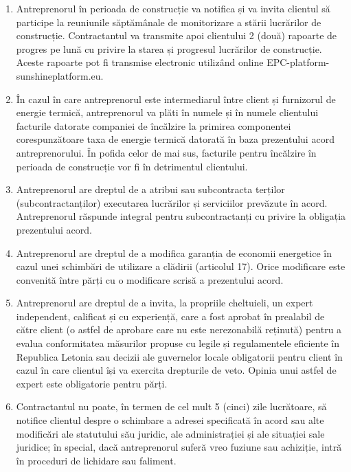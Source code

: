 \begin{multicols}{2}
\begin{enumerate}
\item Antreprenorul în perioada de construcție va notifica și va invita clientul să participe la reuniunile săptămânale de monitorizare a stării lucrărilor de construcție. Contractantul va transmite apoi clientului 2 (două) rapoarte de progres pe lună cu privire la starea și progresul lucrărilor de construcție. Aceste rapoarte pot fi transmise electronic utilizând online EPC-platform- sunshineplatform.eu.
\item În cazul în care antreprenorul este intermediarul între client și furnizorul de energie termică, antreprenorul va plăti în numele și în numele clientului facturile datorate companiei de încălzire la primirea componentei corespunzătoare taxa de energie termică datorată în baza prezentului acord  antreprenorului. În pofida celor de mai sus, facturile pentru încălzire în perioada de construcție vor fi în detrimentul clientului.
\item Antreprenorul are dreptul de a atribui sau subcontracta terților (subcontractanților) executarea lucrărilor și serviciilor prevăzute în acord. Antreprenorul răspunde integral pentru subcontractanți cu privire la obligația prezentului acord.
\item Antreprenorul are dreptul de a modifica garanția de economii energetice în cazul unei schimbări de utilizare a clădirii (articolul 17). Orice modificare este convenită între părți cu o modificare scrisă a prezentului acord.
\item Antreprenorul are dreptul de a invita, la propriile cheltuieli, un expert independent, calificat și cu experiență, care a fost aprobat în prealabil de către client (o astfel de aprobare care nu este nerezonabilă reținută) pentru a evalua conformitatea măsurilor propuse cu legile și regulamentele eficiente în Republica Letonia sau decizii ale guvernelor locale obligatorii pentru client în cazul în care clientul își va exercita drepturile de veto. Opinia unui astfel de expert este obligatorie pentru părți.
\item Contractantul nu poate, în termen de cel mult 5 (cinci) zile lucrătoare, să notifice clientul despre o schimbare a adresei specificată în acord sau alte modificări ale statutului său juridic, ale administrației și ale situației sale juridice; în special, dacă antreprenorul suferă vreo fuziune sau achiziție, intră în proceduri de lichidare sau faliment.
\end{enumerate}


\end{multicols}
